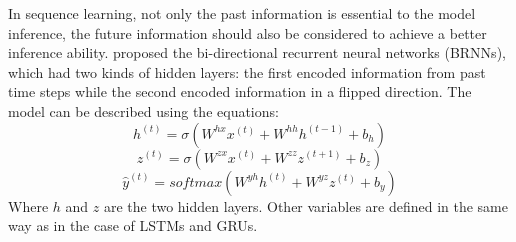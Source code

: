 In sequence learning, not only the past information is essential to the model inference, the future information should also be considered to achieve a better inference ability.  proposed the bi-directional recurrent neural networks (BRNNs), which had two kinds of hidden layers: the first encoded information from past time steps while the second encoded information in a flipped direction. The model can be described using the equations: 
\begin{equation}
h^{(t)} = \sigma\left(W^{hx} x^{(t)} + W^{hh} h^{(t-1)} + b_h\right)
\end{equation}
\begin{equation}
z^{(t)} = \sigma\left(W^{zx} x^{(t)} + W^{zz} z^{(t+1)} + b_z\right)
\end{equation}
\begin{equation}
\hat{y}^{(t)} = softmax\left(W^{yh} h^{(t)} + W^{yz} z^{(t)} + b_y\right)
\end{equation}
Where $h$ and $z$ are the two hidden layers. Other variables are defined in the same way as in the case of LSTMs and GRUs.

